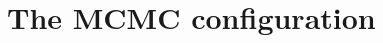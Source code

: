 \documentclass[12pt,oneside]{book}\usepackage[]{graphicx}\usepackage[]{color}
\def\cd#1{\texttt{#1}}
\begin{document}








\section{The MCMC configuration}
\label{sec:mcmc-configuration}
\end{document}
